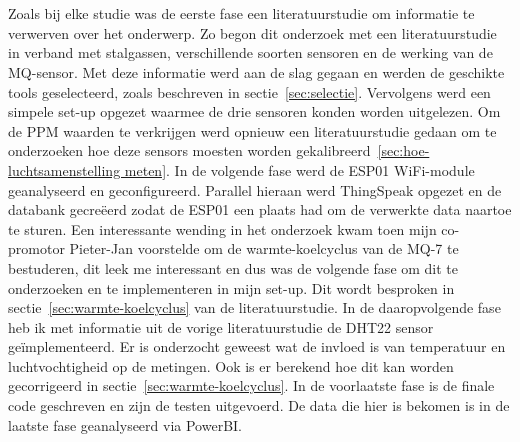 
\chapter{}%
\label{ch:methodologie}


Zoals bij elke studie was de eerste fase een literatuurstudie om informatie te verwerven over het onderwerp. Zo begon dit onderzoek met een literatuurstudie in verband met stalgassen, verschillende soorten sensoren en de werking van de MQ-sensor. Met deze informatie werd aan de slag gegaan en werden de geschikte tools geselecteerd, zoals beschreven in sectie~\ref{sec:selectie}.
Vervolgens werd een simpele set-up opgezet waarmee de drie sensoren konden worden uitgelezen. Om de PPM waarden te verkrijgen werd opnieuw een literatuurstudie gedaan om te onderzoeken hoe deze sensors moesten worden gekalibreerd~\ref{sec:hoe-luchtsamenstelling meten}.
In de volgende fase werd de ESP01 WiFi-module geanalyseerd en geconfigureerd. Parallel hieraan werd ThingSpeak opgezet en de databank gecreëerd zodat de ESP01 een plaats had om de verwerkte data naartoe te sturen.
Een interessante wending in het onderzoek kwam toen mijn co-promotor Pieter-Jan voorstelde om de warmte-koelcyclus van de MQ-7 te bestuderen, dit leek me interessant en dus was de volgende fase om dit te onderzoeken en te implementeren in mijn set-up. Dit wordt besproken in sectie~\ref{sec:warmte-koelcyclus} van de literatuurstudie.
In de daaropvolgende fase heb ik met informatie uit de vorige literatuurstudie de DHT22 sensor geïmplementeerd. Er is onderzocht geweest wat de invloed is van temperatuur en luchtvochtigheid op de metingen. Ook is er berekend hoe dit kan worden gecorrigeerd in sectie~\ref{sec:warmte-koelcyclus}.
In de voorlaatste fase is de finale code geschreven en zijn de testen uitgevoerd. De data die hier is bekomen is in de laatste fase geanalyseerd via PowerBI.



